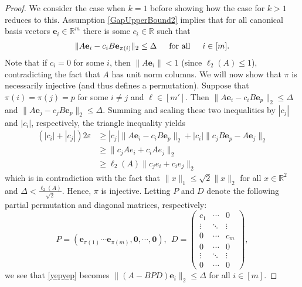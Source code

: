 \documentclass[journal, onecolumn]{IEEEtran}
\begin{document}
\begin{proof}
We consider the case when $k=1$ before showing how the case for $k>1$ reduces to this. Assumption \eqref{GapUpperBound2} implies that for all canonical basis vectors $\mathbf{e}_i \in \mathbb{R}^m$ there is some $c_i \in \mathbb{R}$ such that 
\begin{align}\label{yepyep}
\|A\mathbf{e}_i - c_iB\mathbf{e}_{\pi(i)}\|_2 \leq \Delta \indent \text{for all} \indent i \in [m].
\end{align}
Note that if $c_i = 0$ for some $i$, then $\|A\mathbf{e}_i\| < 1$ (since $\ell_2(A) \leq 1$), contradicting the fact that $A$ has unit norm columns. We will now show that $\pi$ is necessarily injective (and thus defines a permutation). Suppose that $\pi(i) = \pi(j) = p$ for some $i \neq j$ and $\ell \in [m']$. Then $\|A\mathbf{e}_i - c_iB\mathbf{e}_{p}\|_2  \leq \Delta$ and $\|A\mathbf{e}_j - c_jB\mathbf{e}_{p}\|_2 \leq \Delta$. Summing and scaling these two inequalities by $|c_j|$ and $|c_i|$, respectively, the triangle inequality yields
\begin{align*}
(|c_i| + |c_j|) 2\varepsilon
&\geq |c_j|\|A\mathbf{e}_i - c_iB\mathbf{e}_{p}\|_2 + |c_i|\|c_jB\mathbf{e}_{p} - A\mathbf{e}_j\|_2 \\
&\geq \|c_jAe_i + c_iAe_j\|_2 \\
&\geq \ell_2(A)\|c_je_i + c_ie_j\|_2
\end{align*}
%
which is in contradiction with the fact that $\|x\|_1 \leq \sqrt{2}\|x\|_2$ for all $x \in \mathbb{R}^2$ and $\Delta < \frac{\ell_2(A)}{\sqrt{2}}$. Hence, $\pi$ is injective. Letting $P$ and $D$ denote the following partial permutation and diagonal matrices, respectively:
\begin{equation}\label{PandD}
P = \left( \mathbf{e}_{\pi(1)} \cdots \mathbf{e}_{\pi(m)}, \mathbf{0}, \cdots, \mathbf{0} \right), \ \ D = \left(\begin{array}{ccc}c_1 & \cdots & 0 \\\vdots & \ddots & \vdots \\0 & \cdots & c_m \\ 0 & \cdots & 0 \\ \vdots & \ddots & \vdots \\ 0 & \cdots & 0
\end{array}\right),
\end{equation}
%
we see that \eqref{yepyep} becomes $\|(A - BPD)\mathbf{e}_i\|_2 \leq \Delta$ for all $i \in [m]$.


\end{proof}
\end{document}
